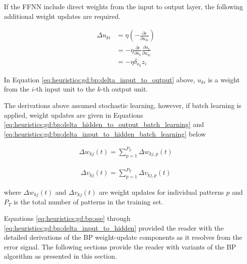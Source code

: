 If the \ac{FFNN} include direct weights from the input to output layer, the following additional weight updates are required.

\begin{equation}
      \label{eq:heuristics:gd:bp:delta_input_to_output}
      \begin{split}
            \Delta u_{ki}
            &= \eta \left( - \frac{\partial \epsilon}{\partial u_{ki}} \right)\\
            &= -\eta \frac{\partial \epsilon}{\partial o_{k}} \frac{\partial o_{k}}{\partial u_{ki}}\\
            &= -\eta \delta_{o_{k}}z_{i}
      \end{split}
\end{equation}

In Equation \ref{eq:heuristics:gd:bp:delta_input_to_output} above, $u_{ki}$ is a weight from the $i$-th input unit to the $k$-th output unit.

The derivations above assumed stochastic learning, however, if batch learning is applied, weight updates are given in Equations \ref{eq:heuristics:gd:bp:delta_hidden_to_output_batch_learning} and \ref{eq:heuristics:gd:bp:delta_input_to_hidden_batch_learning} below

\begin{equation}
      \label{eq:heuristics:gd:bp:delta_hidden_to_output_batch_learning}
      \begin{split}
            \Delta w_{kj}(t) = \sum^{P_{T}}_{p=1} \Delta w_{kj,p}(t)
      \end{split}
\end{equation}

\begin{equation}
      \label{eq:heuristics:gd:bp:delta_input_to_hidden_batch_learning}
      \begin{split}
            \Delta v_{kj}(t) = \sum^{P_{T}}_{p=1} \Delta v_{kj,p}(t)
      \end{split}
\end{equation}

where $\Delta w_{kj}(t)$ and $\Delta v_{kj}(t)$ are weight updates for individual patterns $p$ and $P_{T}$ is the total number of patterns in the training set.

Equations \ref{eq:heuristics:gd:bp:sse} through \ref{eq:heuristics:gd:bp:delta_input_to_hidden} provided the reader with the detailed derivations of the \ac{BP} weight-update components as it resolves from the error signal. The following sections provide the reader with variants of the \ac{BP} algorithm as presented in this section.
